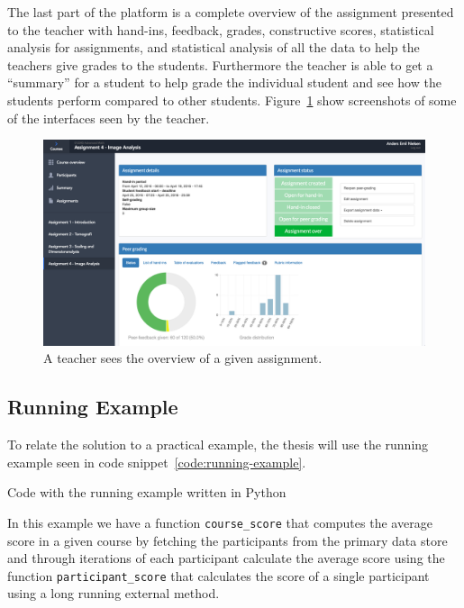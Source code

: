 The last part of the platform is a complete overview of the assignment presented to the teacher with hand-ins, feedback, grades, constructive scores, statistical analysis for assignments, and statistical analysis of all the data to help the teachers give grades to the students. Furthermore the teacher is able to get a ``summary'' for a student to help grade the individual student and see how the students perform compared to other students. Figure~\ref{fig:teacher-screenshot} show screenshots of some of the interfaces seen by the teacher.

\begin{figure}[ht!]
  \centering
  \includegraphics[width=1.0\linewidth]{figures/screenshots/teacher_assignment_overview.png}
  \caption[Screenshot from Peergrade.io]{A teacher sees the overview of a given assignment.}
  \label{fig:teacher-screenshot}
\end{figure}



\subsection{Running Example}
\label{subsec:running-example}

To relate the solution to a practical example, the thesis will use the running example seen in code snippet~\ref{code:running-example}.

\begin{code}{Code with the running example written in Python}
	
	\label{code:running-example}
\end{code}

In this example we have a function \verb$course_score$ that computes the average score in a given course by fetching the participants from the primary data store and through iterations of each participant calculate the average score using the function \verb$participant_score$ that calculates the score of a single participant using a long running external method.

